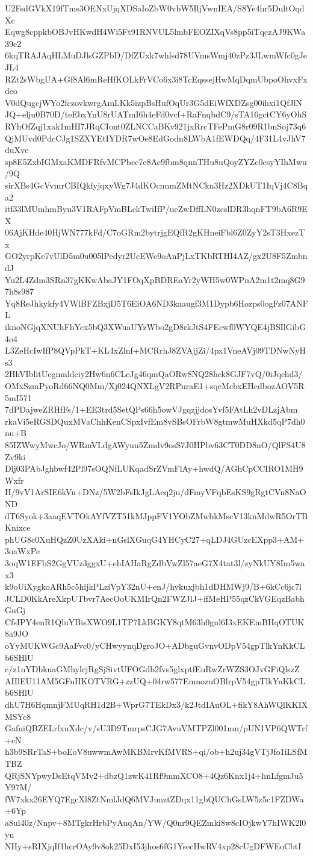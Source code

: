 U2FsdGVkX19fTms3OENxUjqXDSaIoZbW0vbW5IljVwnIEA/S8Ye4hr5DultOqdXc
Eqwg8cppkbOBJvHKwdH4Wi5Ft91RNVUL5lmbFEOZIXqVs8pp5iTqczAJ9KWa39e2
6kqTRAJAqHLMuDJlsGZPbD/DfZUxk7whlsd78UVmsWmj40zPz3JLwmWfc0gJeJL4
RZt2sWbgUA+Gf8Al6mReHfKOLkFrVCo6x3i8TcEqssejHwMqDqmUbpoOhvxFxdeo
V0dQugcjWYo2fczovkwrgAmLKk5izpBsHufOqUr3G5dEiWfXDZsg00ihxi1QfJlN
JQ+elju0B70D/teEbxYnU8rUATmI6h4eFd0vcf+RaFnqbdC9/sTA16gctCY6yOhS
RYhOfZqj1xak1mHI7JRqCIont0ZLNCCaBKv921jxRrcTFePmG8r09R1bnSoj73q6
QjMUvd0PdcCJg1SZXYEtIYDR7wOe8EdGodn8LWbA1fEWDQq/4F31L4vJhV7duXve
sp8E5ZxbIGMxaKMDFRfvMCPbcc7e8Ae9fbm8qnnTHu8uQoyZYZc0csyYIhMwu/9Q
sirXBs4GcVvmrCBIQkfyjqxyWg7J4dKOcnnmZMtNCkn3Hz2XDkUT1IqVj4C8Bqa2
itf33lMUmhmByu3V1RAFpVmBLckTwiIfP/ueZwDffLN0zcslDR3hqnFT9bA6R9EX
06AjKHde40HjWN777kFd/C7oGRm2bytrjgEQfR2gKHneiFbl6Z0ZyY2sT3HxezTx
GO2yrpKe7vUlD5m0u005lPedyr2UcEWe9oAnPjLxTKbRTHI4AZ/gx2U8F5ZmbndJ
Yu2L4Zdm3SRn37gKKwAbaJY1FOqXpBDREaYr2yWH5w0WPnA2m1t2mq8G97h8s987
Yq8ReJhkykfy4VWlBFZBxjD5T6EiOA6ND3kaaugf3M1Dypb6Hozps0ogFz07ANFL
iknoNGjqXNUhFhYcx5bQ3XWuaUYzWbo2gD8rkJtS4FEcwf0WYQE4jBSIlGibG4o4
L3ZeHcIwIfP8QVpPkT+KL4xZlnf+MCRrhJ8ZVAjjZi/4px1VneAVj09TDNwNyHs3
2HhVIblitUcgmnldciy2Hw6n6CLeJg46qmQaORw8NQ28hck8GJF7vQ/0iJqchd3/
OMxSzmPyoRd66NQ0Mm/Xj024QNXLgV2RPuraE1+sqcMcbxEHcdbozAOV5R5mI571
7dPDajweZRHfFs/1+EE3trd5SetQPs66h5owVJgqzjjdosYvf5FAtLh2vDLzjAbm
rkaVi5eRGSDQuxMVaChhKenCSpxIvfEm8vSBsOFrbW8gtmwMuHXkd5qP7dh0nu+B
85IZWwyMwcJo/WRmVLdgAWyuu5Zmdv9osS7J0HPbv63CT0DD8nO/QlFS4U8Zv9ki
Dlj03PAbJghbwf42Pl97sOQNfLUKqadSrZVmFlAy+hwdQ/AGhCpCCIRO1MH9Wxfr
H/9vV1ArSIE6kVu+DNz/5W2bFsIkJgLAeq2ju/dFmyVFqbEsKS9gRgtCVn8NaOND
dT6Syok+3aaqEVTOkAYfVZT51kMJppFV1YObZMwbkMscV13knMdwR5OrTBKnixce
phUG8c0XuHQzZ0UzXAki+nGslXGuqG4YHCyC27+qLDJ4GUzcEXpp3+AM+3oaWxPe
3oqW1EFbS2GgVUz3ggxU+ehIAHaRgZdbVwZl57aeG7X4tat3l/zyNkUY8Im5wax3
k9oUiXygkoARh5c5hijkPLziVpY32nU+enJ/hykuxjbh1dDHMWj9/B+6kCc6jc7l
JCLD0KkAreXkpUTbvr7AecOoUKMIrQn2FWZJlJ+ifMeHP55qzCkVGEqzBabhGnGj
CfsIPY4enR1QluYBisXWO9L1TP7LkBGKY8qtM63h0gnl6I3xEKEmBHqOTUK8a9JO
oYyMUKWGc9AaFvc0/yCHwyynqDgroJO+ADbguGvnvODpV54gpTlkYnKkCLb6SHlU
c/z1nYDbkuaGMhylcjRgSjSivtUFOGdb2fvs5glxptfEuRwZrWZS3OJvGFiQlszZ
AHlEU11AM5GFuHKOTVRG+zzUQ+04rw577EmnozuOBlrpV54gpTlkYnKkCLb6SHlU
dhU7H6HqmnjFMUqRH1d2B+WprG7TEkDx3/k2JtdIAuOL+fikY8AhWQlKKIXMSYc8
GafuiQBZELrfxuXdc/v/sU3D9TmrpsCJG7AvuVMTPZl001mn/pUN1VP6QWTrf+cN
h3b9SRrTaS+boEoV8uwwmAwMKBMrvKfMVRS+qi/ob+h2uj34gVTjJfo1iLSfMTBZ
QRjSNYpwyDsEtqVMv2+dbzQ1zwK41Rf9mmXCO8+4Qz6Knx1j4+hnLfgmJu5Y97M/
fW7xkx26EYQ7EgcXl8ZtNmlJdQ6MVJunztZDqx11gbQUChGsLW5z5c1FZDWa+6Yp
a8ul40z/Nnpv+8MTgkrHrbPyAuqAn/YW/Q0nr9QEZmki8w8cIOjkwY7hIWK2l0yu
NHy+sRIXjqIf1hcrOAy9v8ok25DxI53jhos6fG1YsecHwRV4xp28cUgDFWEoCbtI
